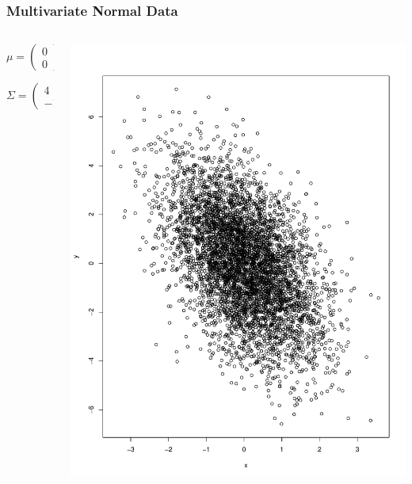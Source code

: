   \begin{frame}
\frametitle{Multivariate Normal Data}
\begin{columns}
\begin{column}{0.4\textwidth}
\[
\mu=\left(\begin{array}{c}
0\\
0
\end{array}\right)
\]

\[
\Sigma=\left(\begin{array}{cc}
4 & -1\\
-1 & 1
\end{array}\right)
\]
\end{column}
\begin{column}{0.6\textwidth} 
    \begin{center}
\includegraphics[width=.8\textwidth]{mvnormal_scatter.pdf}
     \end{center}
\end{column}
\end{columns}
\end{frame}



